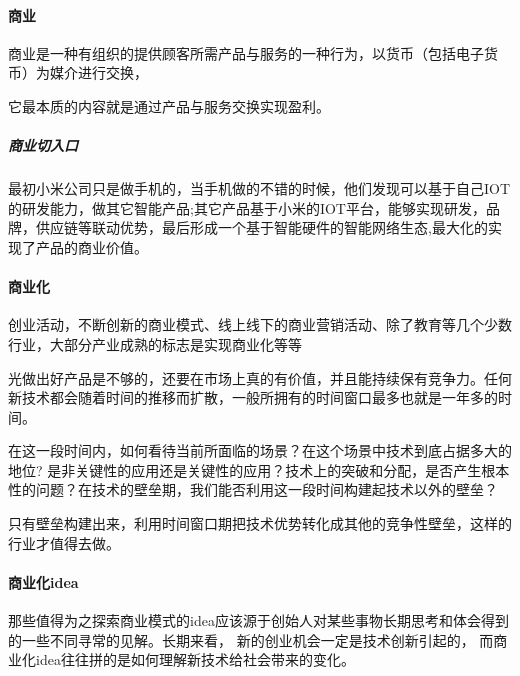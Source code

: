 \documentclass[letterpaper,10pt,english]{sphinxmanual}
\begin{document}
\paragraph{商业}
\label{\detokenize{chapter_idea/business:id5}}
商业是一种有组织的提供顾客所需产品与服务的一种行为，以货币（包括电子货币）为媒介进行交换，%
\begin{footnote}[398]\sphinxAtStartFootnote
{}
%
\end{footnote}它最本质的内容就是通过产品与服务交换实现盈利。


\subparagraph{商业切入口}
\label{\detokenize{chapter_idea/business:id6}}
最初小米公司只是做手机的，当手机做的不错的时候，他们发现可以基于自己IOT的研发能力，做其它智能产品;其它产品基于小米的IOT平台，能够实现研发，品牌，供应链等联动优势，最后形成一个基于智能硬件的智能网络生态,最大化的实现了产品的商业价值。


\paragraph{商业化}
\label{\detokenize{chapter_idea/business:id7}}
创业活动，不断创新的商业模式、线上线下的商业营销活动、除了教育等几个少数行业，大部分产业成熟的标志是实现商业化等等

光做出好产品是不够的，还要在市场上真的有价值，并且能持续保有竞争力。任何新技术都会随着时间的推移而扩散，一般所拥有的时间窗口最多也就是一年多的时间。

在这一段时间内，如何看待当前所面临的场景？在这个场景中技术到底占据多大的地位?
是非关键性的应用还是关键性的应用？技术上的突破和分配，是否产生根本性的问题？在技术的壁垒期，我们能否利用这一段时间构建起技术以外的壁垒？

只有壁垒构建出来，利用时间窗口期把技术优势转化成其他的竞争性壁垒，这样的行业才值得去做。%
\begin{footnote}[399]\sphinxAtStartFootnote
{}
%
\end{footnote}


\paragraph{商业化idea}
\label{\detokenize{chapter_idea/business:idea}}
那些值得为之探索商业模式的idea应该源于创始人对某些事物长期思考和体会得到的一些不同寻常的见解。长期来看，
新的创业机会一定是技术创新引起的，
而商业化idea往往拼的是如何理解新技术给社会带来的变化。
\end{document}
